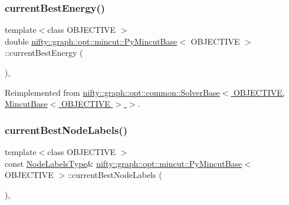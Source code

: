 \subsubsection{\texorpdfstring{current\+Best\+Energy()}{currentBestEnergy()}}
{\footnotesize\ttfamily template$<$class O\+B\+J\+E\+C\+T\+I\+VE $>$ \\
double \hyperlink{classnifty_1_1graph_1_1opt_1_1mincut_1_1PyMincutBase}{nifty\+::graph\+::opt\+::mincut\+::\+Py\+Mincut\+Base}$<$ O\+B\+J\+E\+C\+T\+I\+VE $>$\+::current\+Best\+Energy (\begin{DoxyParamCaption}{ }\end{DoxyParamCaption})\hspace{0.3cm}{\ttfamily [inline]}, {\ttfamily [virtual]}}



Reimplemented from \hyperlink{classnifty_1_1graph_1_1opt_1_1common_1_1SolverBase_a871de6574e6189a0c97c0b2121b07155}{nifty\+::graph\+::opt\+::common\+::\+Solver\+Base$<$ O\+B\+J\+E\+C\+T\+I\+V\+E, Mincut\+Base$<$ O\+B\+J\+E\+C\+T\+I\+V\+E $>$ $>$}.

\mbox{\label{classnifty_1_1graph_1_1opt_1_1mincut_1_1PyMincutBase_afeed3e6753137062c86be81b20d442fa}} 
\subsubsection{\texorpdfstring{current\+Best\+Node\+Labels()}{currentBestNodeLabels()}}
{\footnotesize\ttfamily template$<$class O\+B\+J\+E\+C\+T\+I\+VE $>$ \\
const \hyperlink{classnifty_1_1graph_1_1opt_1_1mincut_1_1PyMincutBase_a54c8146f750e7085a430228c3082a0cf}{Node\+Labels\+Type}\& \hyperlink{classnifty_1_1graph_1_1opt_1_1mincut_1_1PyMincutBase}{nifty\+::graph\+::opt\+::mincut\+::\+Py\+Mincut\+Base}$<$ O\+B\+J\+E\+C\+T\+I\+VE $>$\+::current\+Best\+Node\+Labels (\begin{DoxyParamCaption}{ }\end{DoxyParamCaption})\hspace{0.3cm}{\ttfamily [inline]}, {\ttfamily [virtual]}}



